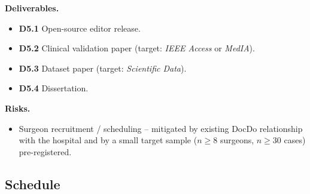 \documentclass[a4paper,11pt,twoside]{article}
\begin{document}
\textbf{Deliverables.}
\begin{itemize}[noitemsep, topsep=3pt]
  \item \textbf{D5.1} Open-source editor release.
  \item \textbf{D5.2} Clinical validation paper (target: \textit{IEEE Access}
        or \textit{MedIA}).
  \item \textbf{D5.3} Dataset paper (target: \textit{Scientific Data}).
  \item \textbf{D5.4} Dissertation.
\end{itemize}

\textbf{Risks.}
\begin{itemize}[noitemsep, topsep=3pt]
  \item Surgeon recruitment / scheduling -- mitigated by existing DocDo
        relationship with the hospital and by a small target sample
        ($n\ge 8$ surgeons, $n\ge 30$ cases) pre-registered.
\end{itemize}

\subsection{Schedule}
\end{document}
